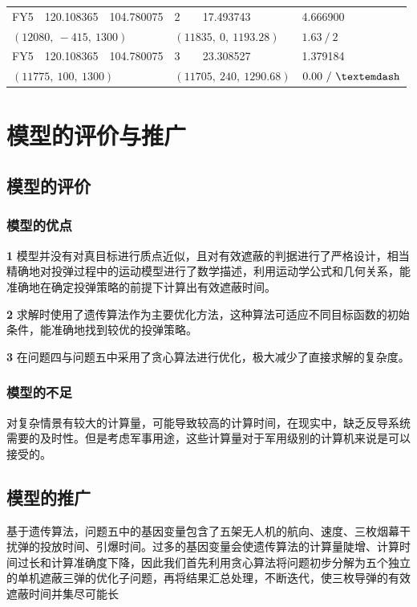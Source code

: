 \documentclass[withoutpreface,bwprint]{cumcmthesis} %
\begin{document}
\begin{longtable}{p{}p{}p{}p{}p{}p{}}
	FY5 & 120.108365 & 104.780075 & 2 & 17.493743 & 4.666900 \\
	\multicolumn{3}{l}{$(12080,\ -415,\ 1300)$} & \multicolumn{2}{l}{$(11835,\ 0,\ 1193.28)$} & $1.63\ /\ 2$ \\
	\addlinespace[2pt]
	
	FY5 & 120.108365 & 104.780075 & 3 & 23.308527 & 1.379184 \\
	\multicolumn{3}{l}{$(11775,\ 100,\ 1300)$} & \multicolumn{2}{l}{$(11705,\ 240,\ 1290.68)$} & $0.00\ /\ \textemdash$ \\
\end{longtable}


\section{模型的评价与推广}

\subsection{模型的评价}

\subsubsection{模型的优点}

\textbf{1} 模型并没有对真目标进行质点近似，且对有效遮蔽的判据进行了严格设计，相当精确地对投弹过程中的运动模型进行了数学描述，利用运动学公式和几何关系，能准确地在确定投弹策略的前提下计算出有效遮蔽时间。

\textbf{2} 求解时使用了遗传算法作为主要优化方法，这种算法可适应不同目标函数的初始条件，能准确地找到较优的投弹策略。

\textbf{3} 在问题四与问题五中采用了贪心算法进行优化，极大减少了直接求解的复杂度。

\subsubsection{模型的不足}

对复杂情景有较大的计算量，可能导致较高的计算时间，在现实中，缺乏反导系统需要的及时性。但是考虑军事用途，这些计算量对于军用级别的计算机来说是可以接受的。

\subsection{模型的推广}

基于遗传算法，问题五中的基因变量包含了五架无人机的航向、速度、三枚烟幕干扰弹的投放时间、引爆时间。过多的基因变量会使遗传算法的计算量陡增、计算时间过长和计算准确度下降，因此我们首先利用贪心算法将问题初步分解为五个独立的单机遮蔽三弹的优化子问题，再将结果汇总处理，不断迭代，使三枚导弹的有效遮蔽时间并集尽可能长
\end{document}
